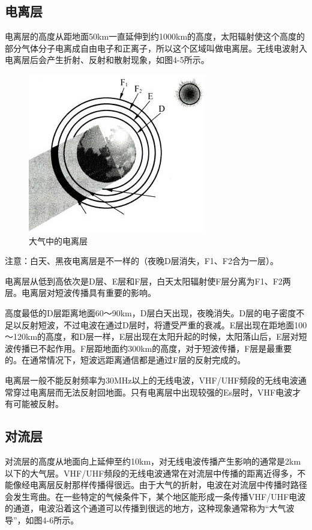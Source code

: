 \documentclass[12pt,UTF8]{ctexbook}
\begin{document}
\subsection{电离层}

电离层的高度从距地面50km一直延伸到约1000km的高度，太阳辐射使这个高度的部分气体分子电离成自由电子和正离子，所以这个区域叫做电离层。无线电波射入电离层后会产生折射、反射和散射现象，如图4-5所示。

\begin{figure}[htbp]
	\centering
	\includegraphics[width=0.7\linewidth]{48}
	\caption{大气中的电离层}
	\label{fig:1}
\end{figure}

注意：白天、黑夜电离层是不一样的（夜晚D层消失，F1、F2合为一层）。

电离层从低到高依次是D层、E层和F层，白天太阳辐射使F层分离为F1、F2两层。电离层对短波传播具有重要的影响。

高度最低的D层距离地面60～90km，D层白天出现，夜晚消失。D层的电子密度不足以反射短波，不过电波在通过D层时，将遭受严重的衰减。E层出现在距地面100～120km的高度，和D层一样，E层出现在太阳升起的时候，太阳落山后，E层对短波传播已不起作用。F层距地面约300km的高度，对于短波传播，F层是最重要的。在通常情况下，短波远距离通信都是通过F层的反射完成的。

电离层一般不能反射频率为30MHz以上的无线电波，VHF/UHF频段的无线电波通常穿过电离层而无法反射回地面。只有电离层中出现较强的Es层时，VHF电波才有可能被反射。

\subsection{对流层}

对流层的高度从地面向上延伸至约10km，对无线电波传播产生影响的通常是2km以下的大气层。VHF/UHF频段的无线电波通常在对流层中传播的距离近得多，不能像经电离层反射那样传播得很远。由于大气的折射，电波在对流层中传播时路径会发生弯曲。在一些特定的气候条件下，某个地区能形成一条传播VHF/UHF电波的通道，电波沿着这个通道可以传播到很远的地方，这种现象通常称为“大气波导”，如图4-6所示。
\end{document}
